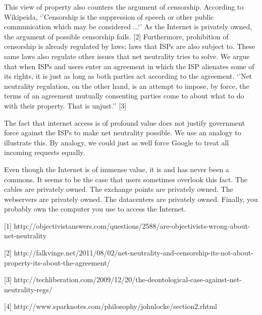This view of property also counters the argument of censorship. According to Wikipeida, `'Censorship is the suppression of speech or other public communication which may be considered ...`' As the Internet is privately owned, the argument of possible censorship fails. [2] Furthermore, prohibition of censorship is already regulated by laws; laws that ISPs are also subject to. These same laws also regulate other issues that net neutrality tries to solve. We argue that when ISPs and users enter an agreement in which the ISP alienates some of its rights, it is just as long as both parties act according to the agreement. `'Net neutrality regulation, on the other hand, is an attempt to impose, by force, the terms of an agreement mutually consenting parties come to about what to do with their property. That is unjust.'' [3]

The fact that internet access is of profound value does not justify government force against the ISPs to make net neutrality possible. We use an analogy to illustrate this. By analogy, we could just as well force Google to treat all incoming requests equally.

Even though the Internet is of immense value, it is and has never been a commons. It seems to be the case that users sometimes overlook this fact. The cables are privately owned. The exchange points are privately owned. The webservers are privately owned. The datacenters are privately owned. Finally, you probably own the computer you use to access the Internet.


[1] http://objectivistanswers.com/questions/2588/are-objectivists-wrong-about-net-neutrality

[2] http://falkvinge.net/2011/08/02/net-neutrality-and-censorship-its-not-about-property-its-about-the-agreement/

[3] http://techliberation.com/2009/12/20/the-deontological-case-against-net-neutrality-regs/

[4] http://www.sparknotes.com/philosophy/johnlocke/section2.rhtml